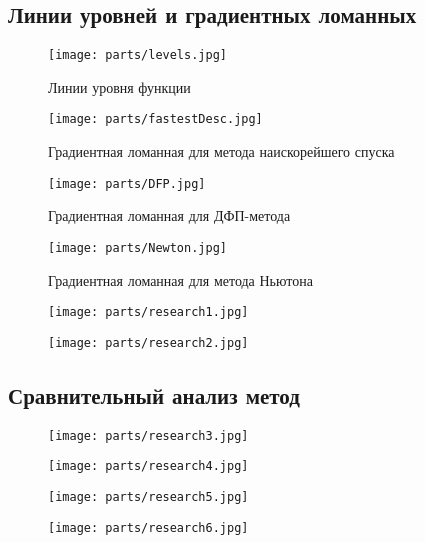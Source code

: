 \documentclass[../body.tex]{subfiles}
\begin{document}
\subsection{Линии уровней и градиентных ломанных}
\begin{figure}[H]
    \centering
    \texttt{[image: parts/levels.jpg]}
    \caption{Линии уровня функции}
\end{figure}

\begin{figure}[H]
    \centering
    \texttt{[image: parts/fastestDesc.jpg]}
    \caption{Градиентная ломанная для метода наискорейшего спуска}
\end{figure}

\begin{figure}[H]
    \centering
    \texttt{[image: parts/DFP.jpg]}
    \caption{Градиентная ломанная для ДФП-метода}
\end{figure}

\begin{figure}[H]
    \centering
    \texttt{[image: parts/Newton.jpg]}
    \caption{Градиентная ломанная для метода Ньютона}
\end{figure}

\begin{figure}[H]
    \centering
    \texttt{[image: parts/research1.jpg]}
\end{figure}

\begin{figure}[H]
    \centering
    \texttt{[image: parts/research2.jpg]}
\end{figure}

\subsection{Сравнительный анализ метод}
\begin{figure}[H]
    \centering
    \texttt{[image: parts/research3.jpg]}
\end{figure}

\begin{figure}[H]
    \centering
    \texttt{[image: parts/research4.jpg]}
\end{figure}

\begin{figure}[H]
    \centering
    \texttt{[image: parts/research5.jpg]}
\end{figure}

\begin{figure}[H]
    \centering
    \texttt{[image: parts/research6.jpg]}
\end{figure}
\end{document}
